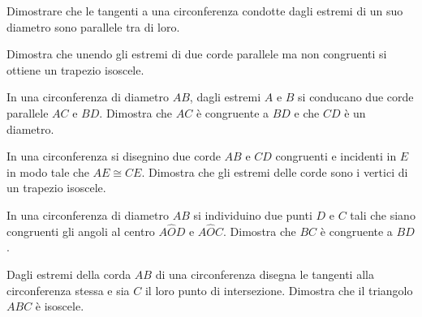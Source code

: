 \begin{multicols}{2}
\begin{esercizio}
\label{ese:5.24}
Dimostrare che le tangenti a una circonferenza condotte dagli estremi 
di un suo diametro sono parallele tra di loro.
\end{esercizio}


\begin{esercizio}
\label{ese:5.30}
Dimostra che unendo gli estremi di due corde parallele ma non 
congruenti si ottiene un trapezio isoscele.
\end{esercizio}



\begin{esercizio}
\label{ese:5.34}
In una circonferenza di diametro $AB$, dagli estremi $A$ e $B$ si 
conducano due corde parallele $AC$ e $BD$. Dimostra che $AC$ è 
congruente a $BD$ e che $CD$ è un diametro.
\end{esercizio}

\begin{esercizio}
\label{ese:5.35}
In una circonferenza si disegnino due corde $AB$ e $CD$ congruenti e 
incidenti in $E$ in modo tale che $AE\cong CE$. Dimostra che gli 
estremi delle corde sono i vertici di un trapezio isoscele.
\end{esercizio}

\begin{esercizio}
\label{ese:5.36}
In una circonferenza di diametro $AB$ si individuino due punti $D$ e 
$C$ tali che siano congruenti gli angoli al centro $A\widehat{O}D$ e 
$A\widehat{O}C$. Dimostra che $BC$ è congruente a $BD$.
\end{esercizio}

\begin{esercizio}
\label{ese:5.37}
Dagli estremi della corda $AB$ di una circonferenza disegna le 
tangenti alla circonferenza stessa e sia $C$ il loro punto di 
intersezione. Dimostra che il triangolo $ABC$ è isoscele.
\end{esercizio}



\end{multicols}
